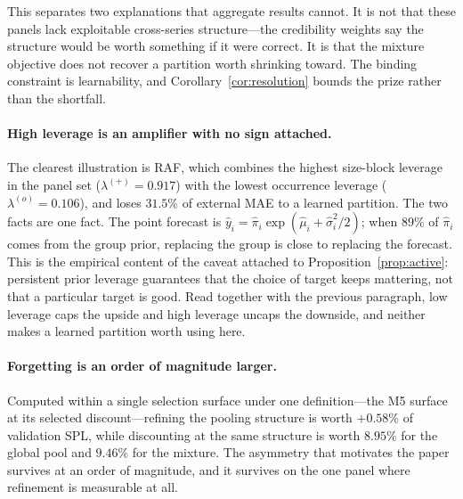 This separates two explanations that aggregate results cannot. It is not
that these panels lack exploitable cross-series structure---the
credibility weights say the structure would be worth something if it were
correct. It is that the mixture objective does not recover a partition
worth shrinking toward. The binding constraint is learnability, and
Corollary~\ref{cor:resolution} bounds the prize rather than the shortfall.

\paragraph{High leverage is an amplifier with no sign attached.}
The clearest illustration is RAF, which combines the highest size-block
leverage in the panel set ($\lambda^{(+)}=0.917$) with the lowest
occurrence leverage ($\lambda^{(o)}=0.106$), and loses $31.5\%$ of
external MAE to a learned partition. The two facts are one fact. The point
forecast is $\hat y_i=\hat\pi_i\exp(\hat\mu_i+\hat\sigma_i^2/2)$; when
$89\%$ of $\hat\pi_i$ comes from the group prior, replacing the group is
close to replacing the forecast. This is the empirical content of the
caveat attached to Proposition~\ref{prop:active}: persistent prior leverage
guarantees that the choice of target keeps mattering, not that a
particular target is good. Read together with the previous paragraph, low
leverage caps the upside and high leverage uncaps the downside, and
neither makes a learned partition worth using here.

\paragraph{Forgetting is an order of magnitude larger.}
Computed within a single selection surface under one definition---the
M5 surface at its selected discount---refining the pooling
structure is worth $+0.58\%$ of validation SPL, while discounting at the
same structure is worth $8.95\%$ for the global pool and $9.46\%$ for the
mixture. The asymmetry that motivates the paper survives at an order of
magnitude, and it survives on the one panel where refinement is
measurable at all.

